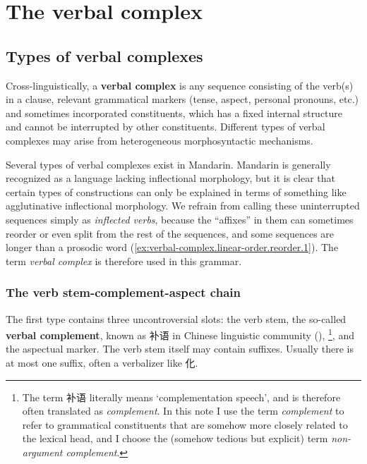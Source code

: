 \documentclass[UTF8, a4paper, oneside, scheme=plain, 12pt]{ctexrep}
\newcommand*{\concept}[1]{\textbf{#1}}
\newcommand*{\term}[1]{\emph{#1}}
\newcommand{\translate}[1]{`#1'}
\begin{document}
\chapter{The verbal complex}\label{chap:verbal-complex}

\section{Types of verbal complexes}\label{sec:verbal-complex.linear-order}

Cross-linguistically, a \concept{verbal complex} is
any sequence consisting of the verb(s) in a clause,
relevant grammatical markers (tense, aspect, personal pronouns, etc.)
and sometimes incorporated constituents,
which has a fixed internal structure and cannot be interrupted by other constituents.
Different types of verbal complexes may arise from
heterogeneous morphosyntactic mechanisms.

Several types of verbal complexes exist in Mandarin.
Mandarin is generally recognized as a language lacking inflectional morphology,
but it is clear that certain types of constructions
can only be explained in terms of something like agglutinative inflectional morphology.
We refrain from calling these uninterrupted sequences simply as \term{inflected verbs},
because the ``affixes'' in them can sometimes reorder or even split from the rest of the sequences,
and some sequences are longer than a prosodic word
(\ref{ex:verbal-complex.linear-order.reorder.1}).
The term \term{verbal complex} is therefore used in this grammar.

\subsection{The verb stem-complement-aspect chain}\label{sec:verbal-complex.v-c-a}

The first type contains three uncontroversial slots:
the verb stem,
the so-called \concept{verbal complement},
known as 补语 in Chinese linguistic community (),%
\footnote{
    The term 补语 literally means \translate{complementation speech}, 
    and is therefore often translated as \term{complement}.
    In this note I use the term \term{complement}
    to refer to grammatical constituents that are somehow more closely 
    related to the lexical head, 
    and I choose the (somehow tedious but explicit) term 
    \term{non-argument complement}.
},
and the aspectual marker.
The verb stem itself may contain suffixes.
Usually there is at most one suffix, often a verbalizer like 化.
\end{document}
